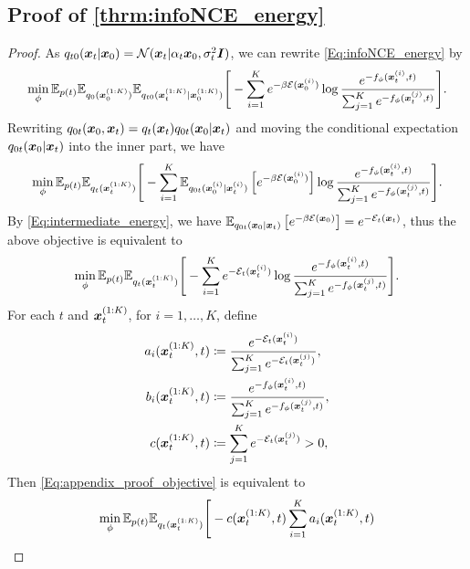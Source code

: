 \subsection{Proof of \cref{thrm:infoNCE_energy}}
\begin{proof}
As $q_{t0}({\bm{x}}_t|{\bm{x}}_0)=\mathcal N({\bm{x}}_t|\alpha_t{\bm{x}}_0,\sigma_t^2\bm{I})$, we can rewrite \eqref{Eq:infoNCE_energy} by
\begin{equation*}
    \min_\phi \mathbb{E}_{p(t)}\mathbb{E}_{q_0({\bm{x}}_0^{(1:K)})}\mathbb{E}_{q_{t0}({\bm{x}}_t^{(1:K)}|{\bm{x}}_0^{(1:K)})}\Bigg[
    - \sum_{i=1}^K
     e^{-\beta{\mathcal{E}}({\bm{x}}_0^{(i)})}
    \log \frac{e^{-f_\phi({\bm{x}}_t^{(i)},t)}}{\sum_{j=1}^K e^{-f_\phi({\bm{x}}_t^{(j)},t)}}
\Bigg].
\end{equation*}
Rewriting $q_{0t}({\bm{x}}_0,{\bm{x}}_t) = q_t({\bm{x}}_t)q_{0t}({\bm{x}}_0|{\bm{x}}_t)$ and moving the conditional expectation $q_{0t}({\bm{x}}_0|{\bm{x}}_t)$ into the inner part, we have
\begin{equation*}
    \min_\phi \mathbb{E}_{p(t)}\mathbb{E}_{q_t({\bm{x}}_t^{(1:K)})}\Bigg[
    - \sum_{i=1}^K
    \mathbb{E}_{q_{0t}({\bm{x}}_0^{(i)}|{\bm{x}}_t^{(i)})}\left[ e^{-\beta{\mathcal{E}}({\bm{x}}_0^{(i)})} \right]
    \log \frac{e^{-f_\phi({\bm{x}}_t^{(i)},t)}}{\sum_{j=1}^K e^{-f_\phi({\bm{x}}_t^{(j)},t)}}
\Bigg].    
\end{equation*}
By \eqref{Eq:intermediate_energy}, we have $\mathbb{E}_{q_{0t}({\bm{x}}_0|{\bm{x}}_t)}\left[ e^{-\beta{\mathcal{E}}({\bm{x}}_0)} \right] = e^{-{\mathcal{E}}_t({\bm{x}}_t)}$, thus the above objective is equivalent to
\begin{equation}
\label{Eq:appendix_proof_objective}
    \min_\phi \mathbb{E}_{p(t)}\mathbb{E}_{q_t({\bm{x}}_t^{(1:K)})}\Bigg[
    - \sum_{i=1}^K
    e^{-{\mathcal{E}}_t({\bm{x}}_t^{(i)})}
    \log \frac{e^{-f_\phi({\bm{x}}_t^{(i)},t)}}{\sum_{j=1}^K e^{-f_\phi({\bm{x}}_t^{(j)},t)}}
\Bigg].
\end{equation}
For each $t$ and ${\bm{x}}_t^{(1:K)}$, for $i=1,\dots,K$, define
\begin{equation*}
\begin{split}
    a_i({\bm{x}}_t^{(1:K)}, t) &\coloneqq  \frac{e^{-{\mathcal{E}}_t({\bm{x}}_t^{(i)})}}{\sum_{j=1}^K e^{-{\mathcal{E}}_t({\bm{x}}_t^{(j)})}}, \\
    b_i({\bm{x}}_t^{(1:K)}, t) &\coloneqq \frac{e^{-f_\phi({\bm{x}}_t^{(i)},t)}}{\sum_{j=1}^K e^{-f_\phi({\bm{x}}_t^{(j)},t)}}, \\
    c({\bm{x}}_t^{(1:K)}, t) &\coloneqq \sum_{j=1}^K e^{-{\mathcal{E}}_t({\bm{x}}_t^{(j)})} > 0,
\end{split}
\end{equation*}
Then \eqref{Eq:appendix_proof_objective} is equivalent to
\begin{equation*}
    \min_\phi \E_{p(t)}\E_{q_t(\x_t^{(1:K)})}\Bigg[
    -c(\x_t^{(1:K)}, t) \sum_{i=1}^K
    a_i(\x_t^{(1:K)},t)

\end{equation*}
\end{proof}
